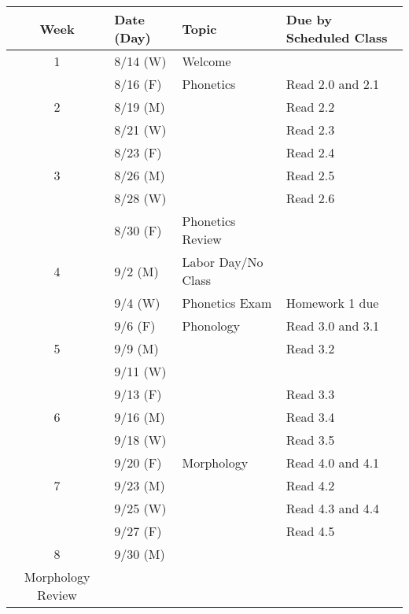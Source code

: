 \documentclass{article}
\makeatletter
\newcommand{\cellbreak}[2]{
    \begin{tabular}[t]{@{}l@{}}
      #1\\
      #2
    \end{tabular}}
\newcommand{\rowvspace}{\rule{0pt}{14pt}}
\makeatother
\begin{document}
    \begin{longtable}{c l l l}
      Week  & Date (Day)  & Topic                           & Due by Scheduled Class\\
      \hline
      1     & 8/14 (W)    & Welcome \rowvspace              & \\
            & 8/16 (F)    & Phonetics                       & Read 2.0 and 2.1\\
      2     & 8/19 (M)    &                                 & Read 2.2\\
            & 8/21 (W)    &                                 & Read 2.3\\
            & 8/23 (F)    &                                 & Read 2.4\\
      3     & 8/26 (M)    &                                 & Read 2.5\\
            & 8/28 (W)    &                                 & Read 2.6\\
            & 8/30 (F)    & Phonetics Review                & \\
      4     & 9/2 (M)     & Labor Day/No Class              & \\
            & 9/4 (W)     & Phonetics Exam                  & Homework 1 due\\
            & 9/6 (F)     & Phonology                       & Read 3.0 and 3.1\\
      5     & 9/9 (M)     &                                 & Read 3.2\\
            & 9/11 (W)    &                                 & \\
            & 9/13 (F)    &                                 & Read 3.3\\
      6     & 9/16 (M)    &                                 & Read 3.4\\
            & 9/18 (W)    &                                 & Read 3.5\\
            & 9/20 (F)    & Morphology                      & Read 4.0 and 4.1\\
      7     & 9/23 (M)    &                                 & Read 4.2\\
            & 9/25 (W)    &                                 & Read 4.3 and 4.4\\
            & 9/27 (F)    &                                 & Read 4.5\\
      8     & 9/30 (M)    & \cellbreak{Phonology \&}
                                      {Morphology Review}   & \\

\end{longtable}
\end{document}
